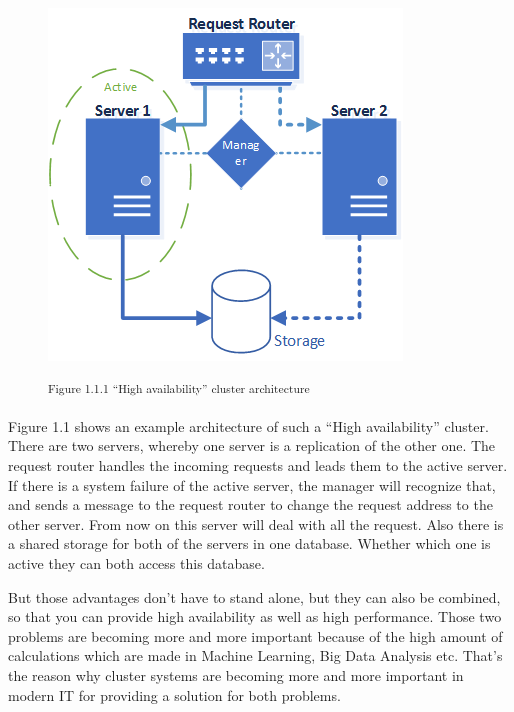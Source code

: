 
\begin{figure}[h]
\centering
\includegraphics[width=\textwidth/2]{images/ha_cluster_architecture.png}

\textsuperscript{Figure 1.1.1 ``High availability'' cluster architecture}
\end{figure}

Figure 1.1 shows an example architecture of such a ``High availability'' cluster. There are two servers, whereby one server is a replication of the other one. The request router handles the incoming requests and leads them to the active server. If there is a system failure of the active server, the manager will recognize that, and sends a message to the request router to change the request address to the other server. From now on this server will deal with all the request. Also there is a shared storage for both of the servers in one database. Whether which one is active they can both access this database.


But those advantages don't have to stand alone, but they can also be combined, so that you can provide high availability as well as high performance. Those two problems are becoming more and more important because of the high amount of calculations which are made in Machine Learning, Big Data Analysis etc. That's the reason why cluster systems are becoming more and more important in modern IT for providing a solution for both problems.


